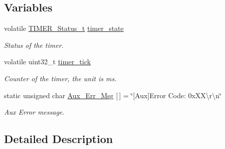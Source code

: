 \subsection*{Variables}
\begin{DoxyCompactItemize}
\item 
volatile \hyperlink{group___k_n_x___aux___exported___types_ga6ed3d972c6c5995cb3fe41995f121b41}{T\+I\+M\+E\+R\+\_\+\+Status\+\_\+t} \hyperlink{group___k_n_x___aux___private___variables_ga23c914a3038b7651aeb6bc1f444fe805}{timer\+\_\+state}\hypertarget{group___k_n_x___aux___private___variables_ga23c914a3038b7651aeb6bc1f444fe805}{}\label{group___k_n_x___aux___private___variables_ga23c914a3038b7651aeb6bc1f444fe805}

\begin{DoxyCompactList}\small\item\em Status of the timer. \end{DoxyCompactList}\item 
volatile uint32\+\_\+t \hyperlink{group___k_n_x___aux___private___variables_ga8c702713be164664bf7d3c5f9cc9002d}{timer\+\_\+tick}\hypertarget{group___k_n_x___aux___private___variables_ga8c702713be164664bf7d3c5f9cc9002d}{}\label{group___k_n_x___aux___private___variables_ga8c702713be164664bf7d3c5f9cc9002d}

\begin{DoxyCompactList}\small\item\em Counter of the timer, the unit is ms. \end{DoxyCompactList}\item 
static unsigned char \hyperlink{group___k_n_x___aux___private___variables_gab56635544aea253fe5a75ded7dda1b2f}{Aux\+\_\+\+Err\+\_\+\+Msg} \mbox{[}$\,$\mbox{]} = \char`\"{}\mbox{[}Aux\mbox{]}Error Code\+: 0x\+X\+X\textbackslash{}r\textbackslash{}n\char`\"{}\hypertarget{group___k_n_x___aux___private___variables_gab56635544aea253fe5a75ded7dda1b2f}{}\label{group___k_n_x___aux___private___variables_gab56635544aea253fe5a75ded7dda1b2f}

\begin{DoxyCompactList}\small\item\em Aux Error message. \end{DoxyCompactList}\end{DoxyCompactItemize}


\subsection{Detailed Description}
